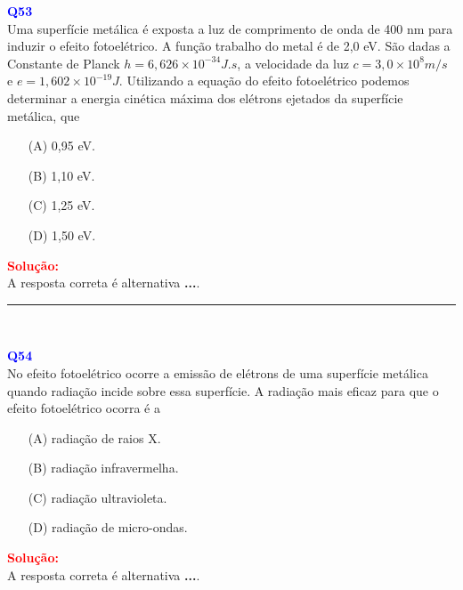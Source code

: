 \documentclass[a4paper,12pt]{article}
\begin{document}
\begin{flushleft}
\textbf{\textcolor{blue}{\Large Q53}}\\
\noindent
Uma superfície metálica é exposta a luz de comprimento de onda de 400 nm para induzir o efeito fotoelétrico. A função
trabalho do metal é de 2,0 eV. São dadas a Constante de Planck $h = 6{,}626 \times 10^{-34} J.s$, a velocidade da luz 
$c = 3{,}0 \times 10^8 m/s$ e $e = 1{,}602 \times 10^{-19} J$. Utilizando a equação do efeito fotoelétrico podemos 
determinar a energia cinética máxima dos elétrons ejetados da superfície metálica, que

\begin{itemize}
\item[(A)] 0,95 eV.
\item[(B)] 1,10 eV.
\item[(C)] 1,25 eV.
\item[(D)] 1,50 eV.
\end{itemize}

\vspace{0.5cm}

\textcolor{red}{\textbf{Solução:}}\\

A resposta correta é alternativa \colorbox{green!50}{\textbf{...}}.
\end{flushleft}

\noindent\rule{\linewidth}{0.6pt}\\

\begin{flushleft}
\textbf{\textcolor{blue}{\Large Q54}}\\
\noindent
No efeito fotoelétrico ocorre a emissão de elétrons de uma
superfície metálica quando radiação incide sobre essa
superfície. A radiação mais eficaz para que o efeito
fotoelétrico ocorra é a

\begin{itemize}
\item[(A)] radiação de raios X.
\item[(B)] radiação infravermelha.
\item[(C)] radiação ultravioleta.
\item[(D)] radiação de micro-ondas.
\end{itemize}

\vspace{0.5cm}

\textcolor{red}{\textbf{Solução:}}\\

A resposta correta é alternativa \colorbox{green!50}{\textbf{...}}.
\end{flushleft}
\end{document}
